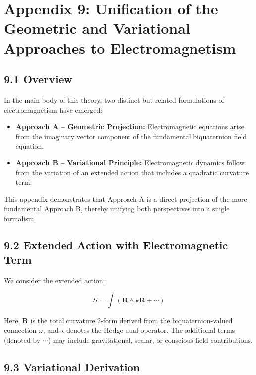 

\appendix
\section*{Appendix 9: Unification of the Geometric and Variational Approaches to Electromagnetism}

\subsection*{9.1 Overview}

In the main body of this theory, two distinct but related formulations of electromagnetism have emerged:

\begin{itemize}
  \item \textbf{Approach A – Geometric Projection:} Electromagnetic equations arise from the imaginary vector component of the fundamental biquaternion field equation.
  \item \textbf{Approach B – Variational Principle:} Electromagnetic dynamics follow from the variation of an extended action that includes a quadratic curvature term.
\end{itemize}

This appendix demonstrates that Approach A is a direct projection of the more fundamental Approach B, thereby unifying both perspectives into a single formalism.

\subsection*{9.2 Extended Action with Electromagnetic Term}

We consider the extended action:

\[
S = \int \left( \mathbf{R} \wedge \star \mathbf{R} + \cdots \right)
\]

Here, \( \mathbf{R} \) is the total curvature 2-form derived from the biquaternion-valued connection \( \omega \), and \( \star \) denotes the Hodge dual operator. The additional terms (denoted by \( \cdots \)) may include gravitational, scalar, or conscious field contributions.

\subsection*{9.3 Variational Derivation}

